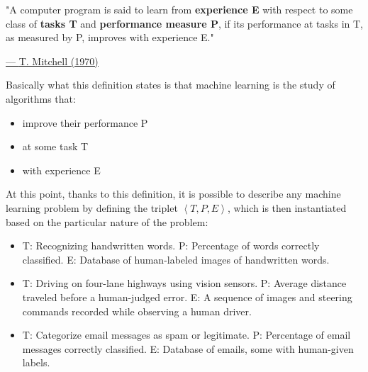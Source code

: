 \vspace{5mm}

\begin{quoting}
    "A computer program is said to learn from \textbf{experience E} with
    respect to some class of \textbf{tasks T} and \textbf{performance
        measure P}, if its performance at tasks in T, as measured by P,
    improves with experience E."
\end{quoting}

\hspace{310pt}
\href{https://en.wikipedia.org/wiki/Tom_M._Mitchell}{--- \underline{T. Mitchell (1970)}}

\vspace{10mm}

Basically what this definition states is that machine learning is the
study of algorithms that:

\begin{itemize}
    \item improve their performance P
    \item at some task T
    \item with experience E
\end{itemize}

\vspace{5mm}

At this point, thanks to this definition, it is possible to describe any
machine learning problem by defining the triplet $\left\langle T,P,E\right\rangle$, which is then instantiated based on the particular
nature of the problem:

\begin{itemize}
    \item
          \begin{example}
              T: Recognizing handwritten words.
              P: Percentage of words correctly classified.
              E: Database of human-labeled images of handwritten words.
          \end{example}
    \item
          \begin{example}
              T: Driving on four-lane highways using vision sensors.
              P: Average distance traveled before a human-judged error.
              E: A sequence of images and steering commands recorded
              while observing a human driver.
          \end{example}
    \item
          \begin{example}
              T: Categorize email messages as spam or legitimate.
              P: Percentage of email messages correctly classified.
              E: Database of emails, some with human-given labels.
          \end{example}
\end{itemize}

